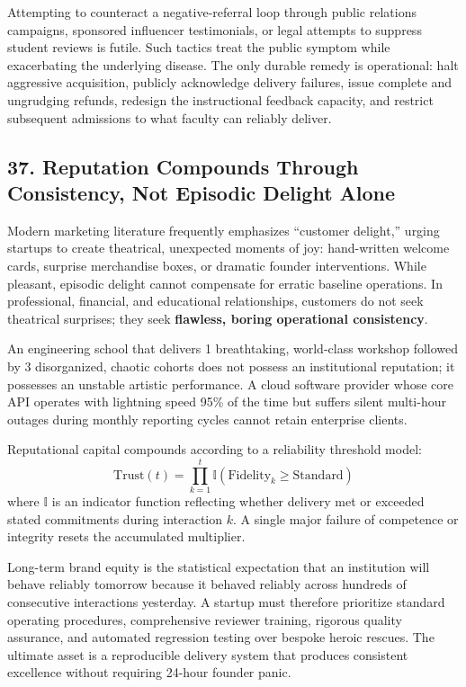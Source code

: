 Attempting to counteract a negative-referral loop through public relations campaigns, sponsored influencer testimonials, or legal attempts to suppress student reviews is futile. Such tactics treat the public symptom while exacerbating the underlying disease. The only durable remedy is operational: halt aggressive acquisition, publicly acknowledge delivery failures, issue complete and ungrudging refunds, redesign the instructional feedback capacity, and restrict subsequent admissions to what faculty can reliably deliver.

\subsection*{37. Reputation Compounds Through Consistency, Not Episodic Delight Alone}

Modern marketing literature frequently emphasizes ``customer delight,'' urging startups to create theatrical, unexpected moments of joy: hand-written welcome cards, surprise merchandise boxes, or dramatic founder interventions. While pleasant, episodic delight cannot compensate for erratic baseline operations. In professional, financial, and educational relationships, customers do not seek theatrical surprises; they seek \textbf{flawless, boring operational consistency}.

An engineering school that delivers 1 breathtaking, world-class workshop followed by 3 disorganized, chaotic cohorts does not possess an institutional reputation; it possesses an unstable artistic performance. A cloud software provider whose core API operates with lightning speed 95\% of the time but suffers silent multi-hour outages during monthly reporting cycles cannot retain enterprise clients.

Reputational capital compounds according to a reliability threshold model:
\begin{equation}
\text{Trust}(t) = \prod_{k=1}^{t} \mathbb{I}\left(\text{Fidelity}_k \ge \text{Standard}\right)
\end{equation}
where $\mathbb{I}$ is an indicator function reflecting whether delivery met or exceeded stated commitments during interaction $k$. A single major failure of competence or integrity resets the accumulated multiplier. 

Long-term brand equity is the statistical expectation that an institution will behave reliably tomorrow because it behaved reliably across hundreds of consecutive interactions yesterday. A startup must therefore prioritize standard operating procedures, comprehensive reviewer training, rigorous quality assurance, and automated regression testing over bespoke heroic rescues. The ultimate asset is a reproducible delivery system that produces consistent excellence without requiring 24-hour founder panic.

